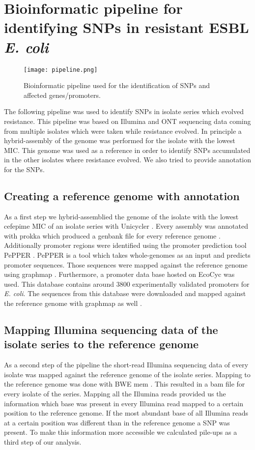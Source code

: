 \section{Bioinformatic pipeline for identifying SNPs in resistant ESBL \textit{E. coli}}
\label{section:pipeline}
\begin{figure}
	\texttt{[image: pipeline.png]}
	\caption{Bioinformatic pipeline used for the identification of SNPs and affected genes/promoters.}
	\label{figure:pipeline}
\end{figure}
The following pipeline was used to identify SNPs in isolate series which evolved resistance. This pipeline was based on Illumina and ONT sequencing data coming from multiple isolates which were taken while resistance evolved. In principle a hybrid-assembly of the genome was performed for the isolate with the lowest MIC. This genome was used as a reference in order to identify SNPs accumulated in the other isolates where resistance evolved. We also tried to provide annotation for the SNPs. 

\subsection{Creating a reference genome with annotation} 
As a first step we hybrid-assemblied the genome of the isolate with the lowest cefepime MIC of an isolate series with Unicycler \cite{wick_unicycler:_2017}. Every assembly was annotated with prokka which produced a genbank file for every reference genome \cite{seemann_prokka:_2014}. Additionally promoter regions were identified using the promoter prediction tool PePPER \cite{pepper}. PePPER is a tool which takes whole-genomes as an input and predicts promoter sequences. Those sequences were mapped against the reference genome using graphmap \cite{sovic_fast_2016}. Furthermore, a promoter data base hosted on EcoCyc was used. This database contains around 3800 experimentally validated promoters for \textit{E. coli}\cite{noauthor_smarttable_nodate}. The sequences from this database were downloaded and mapped against the reference genome with graphmap as well \cite{sovic_fast_2016}. 
\label{section:annotatiion_ref}

\subsection{Mapping Illumina sequencing data of the isolate series to the reference genome}
As a second step of the pipeline the short-read Illumina sequencing data of every isolate was mapped against the reference genome of the isolate series. Mapping to the reference genome was done with BWE mem \cite{li_fast_2009}. This resulted in a bam file for every isolate of the series. Mapping all the Illumina reads provided us the information which base was present in every Illumina read mapped to a certain position to the reference genome. If the most abundant base of all Illumina reads at a certain position was different than in the reference genome a SNP was present. To make this information more accessible we calculated pile-ups as a third step of our analysis. 

